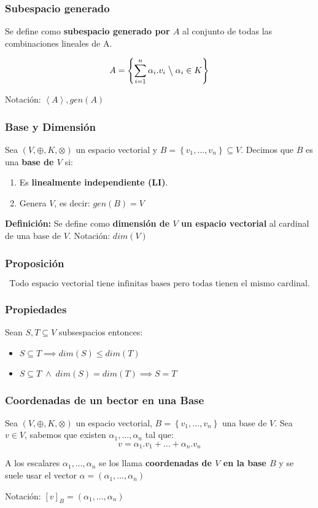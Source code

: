 \subsubsection*{Subespacio generado}
Se define como \textbf{subespacio generado por \(A\)} al conjunto de todas las combinaciones lineales de A.

\[A = \left\{\sum_{i=1}^n \alpha_i . v_i \; \big\backslash \; \alpha_i \in K\right\}\]

Notación: \(\left<A\right>, gen(A)\)
\subsubsection*{Base y Dimensión}
Sea \((V,\oplus,K,\otimes)\) un espacio vectorial y \(B = \left\{v_1,\dots,v_n\right\} \subseteq V\). Decimos que \(B\) es una \textbf{base de \(V\)} si:
\begin{enumerate}
    \item Es \textbf{linealmente independiente (LI)}.
    \item Genera \(V\), es decir: \(gen(B) = V\) 
\end{enumerate} 
\textbf{Definición:} Se define como \textbf{dimensión de \(V\) un espacio vectorial} al cardinal de una base de \(V\). Notación: \(dim(V)\)

\subsubsection*{Proposición}
\[\text{Todo espacio vectorial tiene infinitas bases pero todas tienen el mismo cardinal.}\]
\subsubsection*{Propiedades}
Sean \(S,T \subseteq V\) subsespacios entonces:
\begin{itemize}
    \item \(S \subseteq T \implies dim(S) \leq dim(T)\)
    \item \(S \subseteq T \; \wedge \; dim(S) = dim(T) \implies S = T\)
\end{itemize}
\subsubsection*{Coordenadas de un bector en una Base}
Sea \((V,\oplus, K,\otimes)\) un espacio vectorial, \(B = \left\{v_1,\dots,v_n\right\}\) una base de \(V\). Sea \(v \in V\), sabemos que existen \(\alpha_1, \dots, \alpha_n\) tal que:
\[v = \alpha_1.v_1 + \dots + \alpha_n.v_n\]

A los escalares \(\alpha_1, \dots, \alpha_n\) se los llama \textbf{coordenadas de \(V\) en la base \(B\)} y se suele usar el vector \(\alpha = (\alpha_1, \dots, \alpha_n)\)

Notación: \([v]_B = (\alpha_1,\dots,\alpha_n)\)

